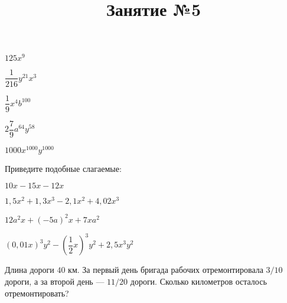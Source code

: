 \begin{listofex}
\begin{enumcols}[itemcolumns=4]
		\item \( 125x^9 \)
		\item \( \dfrac{1}{216}y^{21}x^3 \)
		\item \( \dfrac{1}{9}x^4b^{100} \)
		\item \( 2\dfrac{7}{9}a^{64}y^{58} \)
		\item \( 1000x^{1000}y^{1000} \)
	\end{enumcols}
	\item Приведите подобные слагаемые:
	\begin{enumcols}[itemcolumns=2]
		\item \( 10x-15x-12x \)
		\item \( 1,5x^2+1,3x^3-2,1x^2+4,02x^3 \)
		\item \( 12a^2x+(-5a)^2x+7xa^2 \)
		\item \( (0,01x)^3y^2-\left( \dfrac{1}{2}x \right)^3y^2+2,5x^3y^2 \)
	\end{enumcols}
	\item Длина дороги \( 40 \) км. За первый день бригада рабочих отремонтировала \( 3/10 \) дороги, а за второй день --- \( 11/20 \) дороги. Сколько километров осталось отремонтировать?
\end{listofex}
%
\newpage
\title{Занятие №5}
